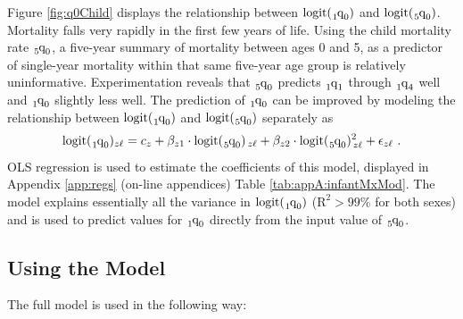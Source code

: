 \documentclass[11pt]{article}
\newcommand{\qf}{\tensor*[_5]{\mbox{q}}{_0}}
\newcommand{\qoz}{\tensor*[_1]{\mbox{q}}{_0}}
\newcommand{\qoo}{\tensor*[_1]{\mbox{q}}{_1}}
\newcommand{\qof}{\tensor*[_1]{\mbox{q}}{_4}}
\newcommand{\logit}{\mbox{logit}}
\begin{document}
Figure \ref{fig:q0Child} displays the relationship between $\logit(\qoz)$ and $\logit(\qf)$.  Mortality falls very rapidly in the first few years of life.  Using the child mortality rate $\qf$, a five-year summary of mortality between ages 0 and 5, as a predictor of single-year mortality within that same five-year age group is relatively uninformative.  Experimentation reveals that $\qf$ predicts $\qoo$ through $\qof$ well and $\qoz$ slightly less well.  The prediction of $\qoz$ can be improved by modeling the relationship between $\logit(\qoz)$ and $\logit(\qf)$ separately as 
\begin{align}
\logit(\qoz)_{z\ell} = c_z + \beta_{z1} \cdot \logit(\qf)_{\, z\ell} + \beta_{z2} \cdot \logit(\qf)^2_{\, z\ell} + \epsilon_{z\ell} \ . \label{eqn:q0Cm}
\end{align}
OLS regression is used to estimate the coefficients of this model, displayed in Appendix \ref{app:regs} (on-line appendices) Table \ref{tab:appA:infantMxMod}.  The model explains essentially all the variance in $\logit(\qoz)$ ($\mbox{R}^2 > 99\%$ for both sexes) and is used to predict values for $\qoz$ directly from the input value of $\qf$.

\subsection{Using the Model}

The full model is used in the following way:
\end{document}
